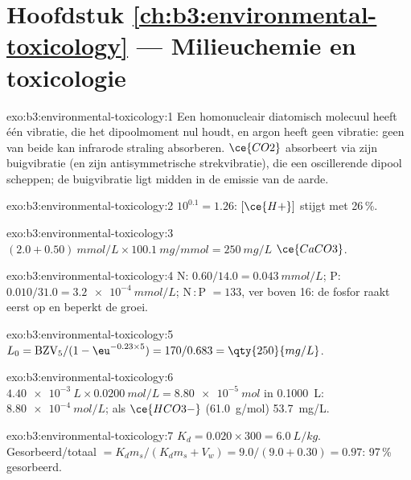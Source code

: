 \section*{Hoofdstuk \ref{ch:b3:environmental-toxicology} --- Milieuchemie en toxicologie}

\begin{solution}{exo:b3:environmental-toxicology:1}
Een homonucleair diatomisch molecuul heeft één vibratie, die het
dipoolmoment nul houdt, en argon heeft geen vibratie: geen van beide kan
infrarode straling absorberen. $\ce{CO2}$ absorbeert via
zijn buigvibratie (en zijn antisymmetrische strekvibratie), die een
oscillerende dipool scheppen; de buigvibratie ligt midden in de emissie
van de aarde.
\end{solution}

\begin{solution}{exo:b3:environmental-toxicology:2}
$10^{0.1} = 1.26$: $[\ce{H+}]$ stijgt met 26\,\%.
\end{solution}

\begin{solution}{exo:b3:environmental-toxicology:3}
$(2.0 + 0.50)\ \unit{mmol/L} \times \qty{100.1}{mg/mmol} = \qty{250}{mg/L}$ $\ce{CaCO3}$.
\end{solution}

\begin{solution}{exo:b3:environmental-toxicology:4}
N: $0.60/14.0 = \qty{0.043}{mmol/L}$; P: $0.010/31.0 = \qty{3.2e-4}{mmol/L}$; N\,:\,P $= 133$, ver boven 16: de fosfor raakt
eerst op en beperkt de groei.
\end{solution}

\begin{solution}{exo:b3:environmental-toxicology:5}
$L_0 = \mathrm{BZV_5}/(1 - \eu^{-0.23 \times 5}) = 170/0.683 = \qty{250}{mg/L}$.
\end{solution}

\begin{solution}{exo:b3:environmental-toxicology:6}
$\qty{4.40e-3}{L} \times \qty{0.0200}{mol/L} = \qty{8.80e-5}{mol}$ in \qty{0.1000}{L}:  $\qty{8.80e-4}{mol/L}$; als $\ce{HCO3-}$ (\qty{61.0}{g/mol})
\qty{53.7}{mg/L}.
\end{solution}

\begin{solution}{exo:b3:environmental-toxicology:7}
$K_d = 0.020 \times 300 = \qty{6.0}{L/kg}$. Gesorbeerd/totaal $= K_dm_s/(K_dm_s + V_w) = 9.0/(9.0 + 0.30) = 0.97$: 97\,\% gesorbeerd.
\end{solution}

